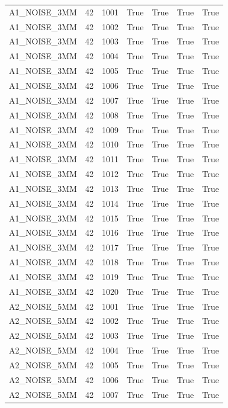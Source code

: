 \documentclass[11pt,a4paper,oneside]{book}
\begin{document}
\begin{longtable}{l l l l l l l}
A1\_NOISE\_3MM & 42 & 1001 & True & True & True & True \\
A1\_NOISE\_3MM & 42 & 1002 & True & True & True & True \\
A1\_NOISE\_3MM & 42 & 1003 & True & True & True & True \\
A1\_NOISE\_3MM & 42 & 1004 & True & True & True & True \\
A1\_NOISE\_3MM & 42 & 1005 & True & True & True & True \\
A1\_NOISE\_3MM & 42 & 1006 & True & True & True & True \\
A1\_NOISE\_3MM & 42 & 1007 & True & True & True & True \\
A1\_NOISE\_3MM & 42 & 1008 & True & True & True & True \\
A1\_NOISE\_3MM & 42 & 1009 & True & True & True & True \\
A1\_NOISE\_3MM & 42 & 1010 & True & True & True & True \\
A1\_NOISE\_3MM & 42 & 1011 & True & True & True & True \\
A1\_NOISE\_3MM & 42 & 1012 & True & True & True & True \\
A1\_NOISE\_3MM & 42 & 1013 & True & True & True & True \\
A1\_NOISE\_3MM & 42 & 1014 & True & True & True & True \\
A1\_NOISE\_3MM & 42 & 1015 & True & True & True & True \\
A1\_NOISE\_3MM & 42 & 1016 & True & True & True & True \\
A1\_NOISE\_3MM & 42 & 1017 & True & True & True & True \\
A1\_NOISE\_3MM & 42 & 1018 & True & True & True & True \\
A1\_NOISE\_3MM & 42 & 1019 & True & True & True & True \\
A1\_NOISE\_3MM & 42 & 1020 & True & True & True & True \\
A2\_NOISE\_5MM & 42 & 1001 & True & True & True & True \\
A2\_NOISE\_5MM & 42 & 1002 & True & True & True & True \\
A2\_NOISE\_5MM & 42 & 1003 & True & True & True & True \\
A2\_NOISE\_5MM & 42 & 1004 & True & True & True & True \\
A2\_NOISE\_5MM & 42 & 1005 & True & True & True & True \\
A2\_NOISE\_5MM & 42 & 1006 & True & True & True & True \\
A2\_NOISE\_5MM & 42 & 1007 & True & True & True & True \\

\end{longtable}
\end{document}
